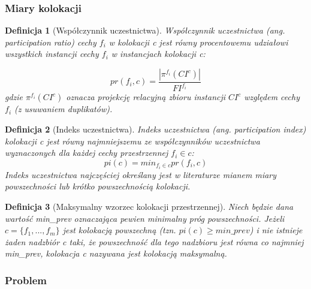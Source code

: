 \documentclass[12pt]{article}
\newtheorem{defin}{Definicja}
\begin{document}
\subsubsection{Miary kolokacji}

\begin{defin}[Współczynnik uczestnictwa]
Współczynnik uczestnictwa (ang. participation ratio) cechy $ f_{i} $ w kolokacji c jest równy procentowemu udziałowi wszystkich instancji cechy $ f_{i} $ w instancjach kolokacji c:

\begin{equation}
pr(f_{i}, c) = \frac{|\pi^{f_{i}}(CI^{c})|}{FI^{f_{i}}}
\end{equation}
gdzie $ \pi^{f_{i}}(CI^{c})$ oznacza projekcję relacyjną zbioru instancji $ CI^{c}$ względem cechy $f_{i}$ (z usuwaniem duplikatów).
\end{defin}

\begin{defin}[Indeks uczestnictwa]Indeks uczestnictwa (ang. participation index) kolokacji c jest równy najmniejszemu ze współczynników uczestnictwa wyznaczonych dla każdej cechy przestrzennej $ f_{i} \in c$:
\begin{equation}
pi(c) = min_{f_{i} \in c} pr(f_{i} ,c)
\end{equation}
Indeks uczestnictwa najczęściej określany jest w literaturze mianem miary powszechności lub krótko powszechnością kolokacji.
\label{def:prevalence}
\end{defin}

\begin{defin}[Maksymalny wzorzec kolokacji przestrzennej]Niech będzie dana wartość min\_prev oznaczająca pewien minimalny próg powszechności. Jeżeli $ c = \{f_{1},...,f_{m} \} $ jest kolokacją powszechną (tzn. $ pi(c) \ge min\_prev $) i nie istnieje żaden nadzbiór c taki, że powszechność dla tego nadzbioru jest równa co najmniej min\_prev, kolokacja c nazywana jest kolokacją maksymalną.
\end{defin}

\subsubsection{Problem}

\end{document}
